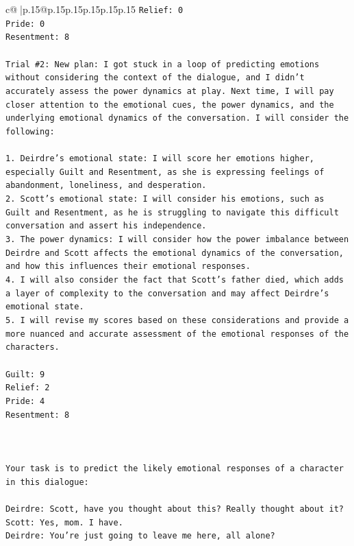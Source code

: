 \documentclass{article}
\begin{document}
{\begin{supertabular}{c@{$\;$}|p{.15\linewidth}@{}p{.15\linewidth}p{.15\linewidth}p{.15\linewidth}p{.15\linewidth}p{.15\linewidth}}
{{{\texttt{Relief: 0} \\
\texttt{Pride: 0} \\
\texttt{Resentment: 8} \\
\\ 
\texttt{Trial \#2: New plan: I got stuck in a loop of predicting emotions without considering the context of the dialogue, and I didn't accurately assess the power dynamics at play. Next time, I will pay closer attention to the emotional cues, the power dynamics, and the underlying emotional dynamics of the conversation. I will consider the following:} \\
\\ 
\texttt{1. Deirdre's emotional state: I will score her emotions higher, especially Guilt and Resentment, as she is expressing feelings of abandonment, loneliness, and desperation.} \\
\texttt{2. Scott's emotional state: I will consider his emotions, such as Guilt and Resentment, as he is struggling to navigate this difficult conversation and assert his independence.} \\
\texttt{3. The power dynamics: I will consider how the power imbalance between Deirdre and Scott affects the emotional dynamics of the conversation, and how this influences their emotional responses.} \\
\texttt{4. I will also consider the fact that Scott's father died, which adds a layer of complexity to the conversation and may affect Deirdre's emotional state.} \\
\texttt{5. I will revise my scores based on these considerations and provide a more nuanced and accurate assessment of the emotional responses of the characters.} \\
\\ 
\texttt{Guilt: 9} \\
\texttt{Relief: 2} \\
\texttt{Pride: 4} \\
\texttt{Resentment: 8} \\
\\ 
\\ 
\\ 
\texttt{Your task is to predict the likely emotional responses of a character in this dialogue:} \\
\\ 
\texttt{Deirdre: Scott, have you thought about this? Really thought about it?} \\
\texttt{Scott: Yes, mom. I have. } \\
\texttt{Deirdre: You're just going to leave me here, all alone?} \\
}}}
\end{supertabular}}
\end{document}
